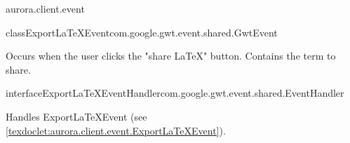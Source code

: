 \begin{texdocpackage}{aurora.client.event}
\begin{texdocclass}{class}{ExportLaTeXEvent}{com.google.gwt.event.shared.GwtEvent}{}
\label{texdoclet:aurora.client.event.ExportLaTeXEvent}
\begin{texdocclassintro}
Occurs when the user clicks the "share LaTeX" button. Contains the term to share.\end{texdocclassintro}
\begin{texdocclassfields}
\end{texdocclassfields}
\begin{texdocclassconstructors}
\end{texdocclassconstructors}
\begin{texdocclassmethods}
\end{texdocclassmethods}
\end{texdocclass}


\begin{texdocclass}{interface}{ExportLaTeXEventHandler}{}{com.google.gwt.event.shared.EventHandler}
\label{texdoclet:aurora.client.event.ExportLaTeXEventHandler}
\begin{texdocclassintro}
Handles ExportLaTeXEvent (see \ref{texdoclet:aurora.client.event.ExportLaTeXEvent}).\end{texdocclassintro}
\begin{texdocclassmethods}
\end{texdocclassmethods}
\end{texdocclass}



\end{texdocpackage}
